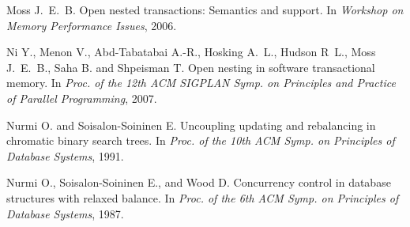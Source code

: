 \begin{thebibliography}{99}
{
Moss J.~E.~B.
\newblock Open nested transactions: Semantics and support.
\newblock In {\em Workshop on Memory Performance Issues}, 2006.





Ni Y., Menon V., Abd-Tabatabai A.-R., Hosking A.~L.,
  Hudson R~L., Moss J.~E.~B., Saha B. and Shpeisman T.
\newblock Open nesting in software transactional memory.
\newblock In {\em Proc. of the 12th ACM SIGPLAN Symp. on Principles and
  Practice of Parallel Programming}, 2007.


% 


Nurmi O. and Soisalon-Soininen E.
\newblock Uncoupling updating and rebalancing in chromatic binary search trees.
\newblock In {\em Proc. of the 10th ACM Symp. on Principles of Database
  Systems}, 1991.




Nurmi O., Soisalon-Soininen E., and Wood D.
\newblock Concurrency control in database structures with relaxed balance.
\newblock In {\em Proc. of the 6th ACM Symp. on Principles of Database
  Systems}, 1987.

% 


}
\end{thebibliography}

